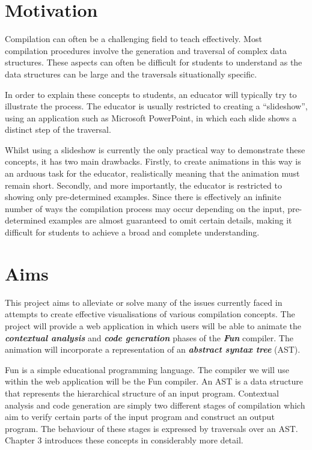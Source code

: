 \documentclass{l4proj}
\begin{document}
\section{Motivation}
Compilation can often be a challenging field to teach effectively. Most compilation procedures involve the generation and traversal of complex data structures. These aspects can often be difficult for students to understand as the data structures can be large and the traversals situationally specific. 

In order to explain these concepts to students, an educator will typically try to illustrate the process. The educator is usually restricted to creating a ``slideshow'', using an application such as Microsoft PowerPoint, in which each slide shows a distinct step of the traversal. 

Whilst using a slideshow is currently the only practical way to demonstrate these concepts, it has two main drawbacks. Firstly, to create animations in this way is an arduous task for the educator, realistically meaning that the animation must remain short. Secondly, and more importantly, the educator is restricted to showing only pre-determined examples. Since there is effectively an infinite number of ways the compilation process may occur depending on the input, pre-determined examples are almost guaranteed to omit certain details, making it difficult for students to achieve a broad and complete understanding.

\section{Aims}
This project aims to alleviate or solve many of the issues currently faced in attempts to create effective visualisations of various compilation concepts. The project will provide a web application in which users will be able to animate the \textit{\textbf{contextual analysis}} and \textit{\textbf{code generation}} phases of the \textit{\textbf{Fun}} compiler. The animation will incorporate a representation of an \textit{\textbf{abstract syntax tree}} (AST). 

Fun is a simple educational programming language. The compiler we will use within the web application will be the Fun compiler. An AST is a data structure that represents the hierarchical structure of an input program. Contextual analysis and code generation are simply two different stages of compilation which aim to verify certain parts of the input program and construct an output program. The behaviour of these stages is expressed by traversals over an AST. Chapter 3 introduces these concepts in considerably more detail.
\end{document}
